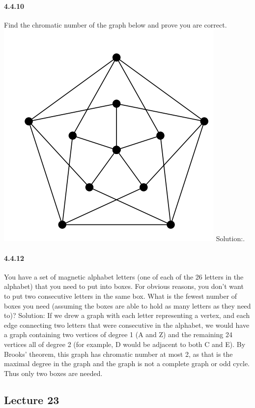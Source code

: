 \documentclass{article}
\begin{document}
\paragraph{4.4.10}
Find the chromatic number of the graph below and prove you are
correct.\newline
\includegraphics{0087}\newline
Solution:.
\paragraph{4.4.12}
You have a set of magnetic alphabet letters (one of each of the 26 letters
in the alphabet) that you need to put into boxes. For obvious reasons,
you don’t want to put two consecutive letters in the same box. What is
the fewest number of boxes you need (assuming the boxes are able to
hold as many letters as they need to)?\newline
Solution:\newline
If we drew a graph with each letter representing a vertex, and
each edge connecting two letters that were consecutive in the alphabet, we
would have a graph containing two vertices of degree 1 (A and Z) and the
remaining 24 vertices all of degree 2 (for example, D would be adjacent to
both C and E). By Brooks’ theorem, this graph has chromatic number at
most 2, as that is the maximal degree in the graph and the graph is not a
complete graph or odd cycle. Thus only two boxes are needed.
\subsection{Lecture 23}
\end{document}
